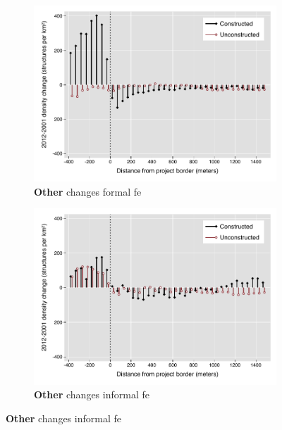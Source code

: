 \documentclass[12pt]{article}
\begin{document}
\begin{figure}
\begin{subfigure}[b]{0.48\textwidth}
        \end{subfigure}
        \begin{subfigure}[b]{0.48\textwidth}
                    \caption[Network2]%
            {{\footnotesize \textbf{Other} changes formal fe}}   
            \label{fig:prefor}
            \centering
            \includegraphics[width=\textwidth,trim={0.3cm .3cm 0.1cm 0cm}, clip=true]{figures/bblu_for_fe_rawchanges_4_3_sp_postk.pdf}

        \end{subfigure}
        \hfill
        \begin{subfigure}[b]{0.48\textwidth} 
                    \caption[]%
            {{\footnotesize \textbf{Other} changes informal  fe}}      
            \label{fig:preinf} 
            \centering 
            \includegraphics[width=\textwidth,trim={0.3cm .3cm 0.1cm 0cm}, clip=true]{figures/bblu_inf_fe_rawchanges_4_3_sp_postk.pdf}

        \end{subfigure}
\end{figure}
\end{document}
